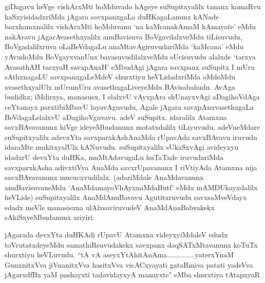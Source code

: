 \begin{artha}
giDagavu heVge vishArxMti hoMduvado hAgeye suSupitxyalilx tananx kamaRvu kaSxyisidadxriMda jAgara savxpanxgaLa duHKagaLanunx kANade barxhamxnalilx vishArxMti hoMduvanu `na kaMcanakAmaM kAmayate' eMdu nakAravu jAgarAvasethxyalilx anuBavisuva BoVgavilalxveMdu tiLisuvudu, BoVgadalilxruva oLaBeVdagaLu anaMtavAgiruvudariMda `kaMcana' eMdu yAvudoMdu BoVgayxvanUnx bayasuvudilalxveMdu sUcisuvudu alalxde `tarxya AvasathAH tarxyaH savxpAnxH' eMbudAgi jAgara savxpanx suSupitx I mUru sAthxnagaLU savxpanxgaLeMdeV shurxtiyu heVLidadxriMda oMdoMdu avasethxyalUlx mUrumUru avasethxgaLiveyeMdu BAvisabahudu. AvAga budidhx; iMdirxya, manasusx, I elalxvU vAyxpAra shUnayxvAgi aDagihoVdAga ceYtanayx parxtibiMbavU layavAguvudu, Agale jAgara savxpAnxvasethxgaLa BeVdagaLelalxvU aDagihoVguvavu. adeV suSupitx. idaralilx Atamxna savxBAvavanunx hiVge ideyeMbudanunx motatxdalilx tiLiyuvudu. adeVneMdare suSupitxyalilx adevxYta savxparxkAshAnaMda rUpavAda savxBAvavu iruvudu idaraMte mukitxyalUlx kANuvudu. suSupitxyalilx sUkaSxvAgi avideyxyu idadxrU devxYta duHKa, muMtAdavugaLu huTaTxde iruvudariMda savxparxkAsha adivxtiVya AnaMda savxrUpavanunx I riVtiyAda Atamxna nija savxBAvavanunx mucucxvudilalx. (adariMdale AnaMdavanunx anuBavisuvaneMdu `AnaMdamayoVhAyxnaMdaButf' eMdu mAMDUkayxdalilx heVLide) suSupitxyalilx AnaMdAnuBavavu Agutitxruvudu savxsaMveVdayx edadx meVle manasisxna ulAlxsaviruvudeV AnaMdAnuBabvakekx sAkiSxyeMbudanunx ariyiri. 
\end{artha}


\begin{artha}
jAgarada devxYta duHKAdi rUpavU Atamxna videyxyiMdaleV edudx toVrutatxdeyeMdu samathiRsuvudakekx savxpanx daqSATxMtavanunx koTuTx shurxtiyu heVLuvudu. ``tA vA aseyxYtAhitAnAma..............yaterxYnaM GunxnitxVva jiVnanitxVva hasitxVva vicACxyayati gataRmiva patati yadeVva jAgarxdfBx yaM pashayxti tadavidayxyA manayxte" eMba shurxtiya tAtapxyaR
\end{artha}

